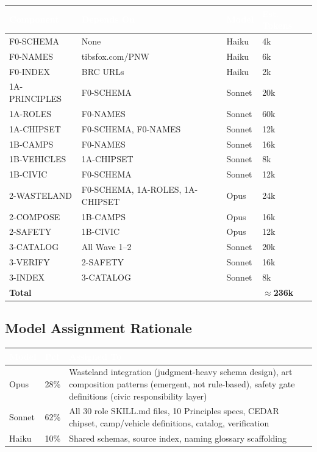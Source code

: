 \documentclass[11pt,letterpaper]{article}
\newcommand{\tableheader}[1]{\textbf{\sffamily\textcolor{white}{#1}}}
\begin{document}
\begin{center}
\begin{tabularx}{\textwidth}{L{3cm}L{2.5cm}C{1.5cm}C{2cm}}
\toprule
{}
\tableheader{Component} & \tableheader{Depends On} & \tableheader{Model} & \tableheader{Est. Tokens} \\
\midrule
F0-SCHEMA & None & Haiku & 4k \\
F0-NAMES & tibsfox.com/PNW & Haiku & 6k \\
F0-INDEX & BRC URLs & Haiku & 2k \\
1A-PRINCIPLES & F0-SCHEMA & Sonnet & 20k \\
1A-ROLES & F0-NAMES & Sonnet & 60k \\
1A-CHIPSET & F0-SCHEMA, F0-NAMES & Sonnet & 12k \\
1B-CAMPS & F0-NAMES & Sonnet & 16k \\
1B-VEHICLES & 1A-CHIPSET & Sonnet & 8k \\
1B-CIVIC & F0-SCHEMA & Sonnet & 12k \\
2-WASTELAND & F0-SCHEMA, 1A-ROLES, 1A-CHIPSET & Opus & 24k \\
2-COMPOSE & 1B-CAMPS & Opus & 16k \\
2-SAFETY & 1B-CIVIC & Opus & 12k \\
3-CATALOG & All Wave 1--2 & Sonnet & 20k \\
3-VERIFY & 2-SAFETY & Sonnet & 16k \\
3-INDEX & 3-CATALOG & Sonnet & 8k \\
\midrule
\textbf{Total} & & & \textbf{$\approx$236k} \\
\bottomrule
\end{tabularx}
\end{center}

\subsection{Model Assignment Rationale}

\begin{center}
\begin{tabularx}{\textwidth}{L{2cm}C{1.5cm}X}
\toprule
{}
\tableheader{Model} & \tableheader{Pct} & \tableheader{Assigned To} \\
\midrule
Opus & 28\% & Wasteland integration (judgment-heavy schema design), art composition patterns (emergent, not rule-based), safety gate definitions (civic responsibility layer) \\
Sonnet & 62\% & All 30 role SKILL.md files, 10 Principles specs, CEDAR chipset, camp/vehicle definitions, catalog, verification \\
Haiku & 10\% & Shared schemas, source index, naming glossary scaffolding \\
\bottomrule
\end{tabularx}
\end{center}
\end{document}
